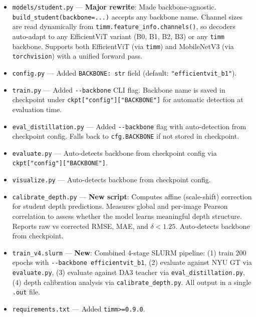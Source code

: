 \documentclass[11pt,a4paper]{article}
\begin{document}
\begin{itemize}[nosep]
  \item \texttt{models/student.py} --- \textbf{Major rewrite}: Made
    backbone-agnostic. \texttt{build\_student(backbone=...)} accepts any
    backbone name. Channel sizes are read dynamically from
    \texttt{timm.feature\_info.channels()}, so decoders auto-adapt to any
    EfficientViT variant (B0, B1, B2, B3) or any \texttt{timm} backbone.
    Supports both EfficientViT (via \texttt{timm}) and MobileNetV3 (via
    \texttt{torchvision}) with a unified forward pass.

  \item \texttt{config.py} --- Added \texttt{BACKBONE: str} field
    (default: \texttt{"efficientvit\_b1"}).

  \item \texttt{train.py} --- Added \texttt{-{}-backbone} CLI flag.
    Backbone name is saved in checkpoint under \texttt{ckpt["config"]["BACKBONE"]}
    for automatic detection at evaluation time.

  \item \texttt{eval\_distillation.py} --- Added \texttt{-{}-backbone} flag
    with auto-detection from checkpoint config. Falls back to
    \texttt{cfg.BACKBONE} if not stored in checkpoint.

  \item \texttt{evaluate.py} --- Auto-detects backbone from checkpoint config
    via \texttt{ckpt["config"]["BACKBONE"]}.

  \item \texttt{visualize.py} --- Auto-detects backbone from checkpoint config.

  \item \texttt{calibrate\_depth.py} --- \textbf{New script}: Computes affine
    (scale-shift) correction for student depth predictions. Measures global
    and per-image Pearson correlation to assess whether the model learns
    meaningful depth structure. Reports raw vs corrected RMSE, MAE, and
    $\delta < 1.25$. Auto-detects backbone from checkpoint.

  \item \texttt{train\_v4.slurm} --- \textbf{New}: Combined 4-stage SLURM
    pipeline: (1) train 200 epochs with \texttt{-{}-backbone efficientvit\_b1},
    (2) evaluate against NYU GT via \texttt{evaluate.py},
    (3) evaluate against DA3 teacher via \texttt{eval\_distillation.py},
    (4) depth calibration analysis via \texttt{calibrate\_depth.py}.
    All output in a single \texttt{.out} file.

  \item \texttt{requirements.txt} --- Added \texttt{timm>=0.9.0}.
\end{itemize}
\end{document}
